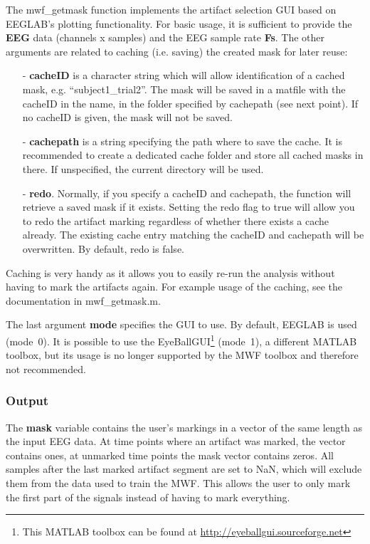 \documentclass[11pt]{article}
\begin{document}
The mwf\_getmask function implements the artifact selection GUI based on EEGLAB's plotting functionality. For basic usage, it is sufficient to provide the \textbf{EEG} data (channels x samples) and the EEG sample rate \textbf{Fs}. The other arguments are related to caching (i.e. saving) the created mask for later reuse:

\begin{itemize}[noitemsep]
\item[-] \textbf{cacheID} is a character string which will allow identification of a cached mask, e.g. ``subject1\_trial2''. The mask will be saved in a matfile with the cacheID in the name, in the folder specified by cachepath (see next point). If no cacheID is given, the mask will not be saved.
\item[-] \textbf{cachepath} is a string specifying the path where to save the cache. It is recommended to create a dedicated cache folder and store all cached masks in there. If unspecified, the current directory will be used.
\item[-] \textbf{redo}. Normally, if you specify a cacheID and cachepath, the function will retrieve a saved mask if it exists. Setting the redo flag to true will allow you to redo the artifact marking regardless of whether there exists a cache already. The existing cache entry matching the cacheID and cachepath will be overwritten. By default, redo is false.
\end{itemize}

Caching is very handy as it allows you to easily re-run the analysis without having to mark the artifacts again. For example usage of the caching, see the documentation in mwf\_getmask.m.

The last argument \textbf{mode} specifies the GUI to use. By default, EEGLAB is used (mode~0). It is possible to use the EyeBallGUI\footnote{This MATLAB toolbox can be found at \url{http://eyeballgui.sourceforge.net}} (mode~1), a different MATLAB toolbox, but its usage is no longer supported by the MWF toolbox and therefore not recommended.

\subsubsection{Output}

The \textbf{mask} variable contains the user's markings in a vector of the same length as the input EEG data. At time points where an artifact was marked, the vector contains ones, at unmarked time points the mask vector contains zeros. All samples after the last marked artifact segment are set to NaN, which will exclude them from the data used to train the MWF. This allows the user to only mark the first part of the signals instead of having to mark everything.
\end{document}

